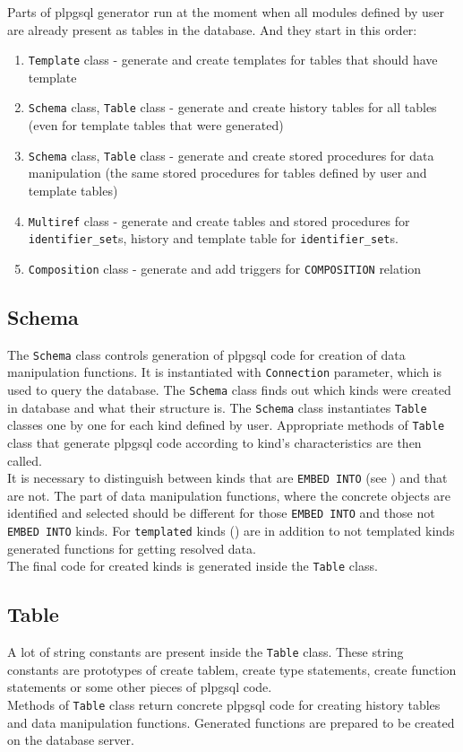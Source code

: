 \documentclass[deska]{subfiles}
\begin{document}
Parts of plpgsql generator run at the moment when all modules defined by user are already present as tables in the database. And they start in this order:

\begin{enumerate}
    \item {\tt Template} class - generate and create templates for tables that should have template
    \item {\tt Schema} class, {\tt Table} class - generate and create history tables for all tables (even for template tables that were generated)
    \item {\tt Schema} class, {\tt Table} class - generate and create stored procedures for data manipulation (the same stored procedures for tables defined by user and template tables)
    \item {\tt Multiref} class - generate and create tables and stored procedures for {\tt identifier\_set}s, history and template table for {\tt identifier\_set}s.
    \item {\tt Composition} class - generate and add triggers for {\tt COMPOSITION} relation
\end{enumerate}

\subsection{Schema}
The {\tt Schema} class controls generation of plpgsql code for creation of data manipulation functions. It is instantiated with {\tt Connection} parameter, which is used to query the database. 
The {\tt Schema} class finds out which kinds were created in database and what their structure is. The {\tt Schema} class instantiates {\tt Table} classes one by one for each kind defined by user. Appropriate methods of {\tt Table} class that generate plpgsql code according to kind's characteristics are then called.\\ It is necessary to distinguish between kinds that are {\tt EMBED INTO} (see ) and that are not. The part of data manipulation functions, where the concrete objects are identified and selected should be different for those {\tt EMBED INTO} and those not {\tt EMBED INTO} kinds.
For {\tt templated} kinds () are in addition to not templated kinds generated functions for getting resolved data.\\
The final code for created kinds is generated inside the {\tt Table} class.

\subsection{Table}
A lot of string constants are present inside the {\tt Table} class. These string constants are prototypes of create tablem, create type statements, create function statements or some other pieces of plpgsql code.\\
Methods of {\tt Table} class return concrete plpgsql code for creating history tables and data manipulation functions. Generated functions are prepared to be created on the database server.\\
\end{document}
